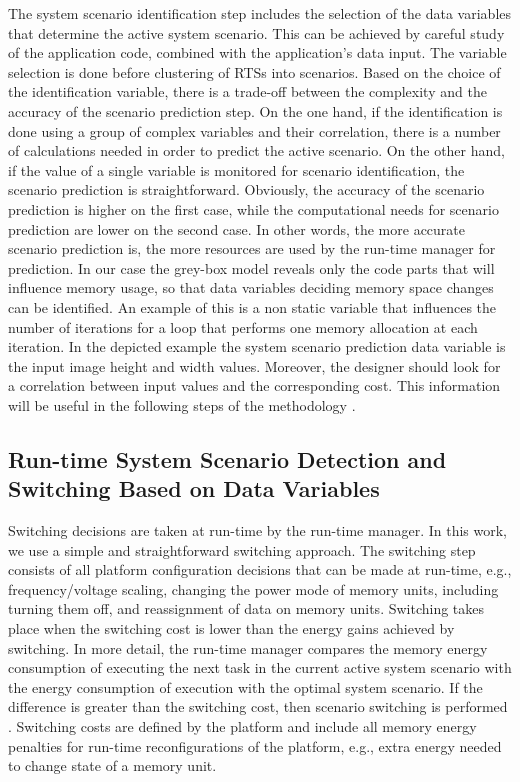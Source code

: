 \documentclass[smallcondensed]{svjour3}
\begin{document}
The system scenario identification step includes the selection of the data variables that determine the active system scenario. 
This can be achieved by careful study of the application code, combined with the application's data input.
The variable selection is done before clustering of RTSs into scenarios.
Based on the choice of the identification variable, there is a trade-off between the complexity and the accuracy of the scenario prediction step.
On the one hand, if the identification is done using a group of complex variables and their correlation, there is a number of calculations needed in order to predict the active scenario. 
On the other hand, if the value of a single variable is monitored for scenario identification, the scenario prediction is straightforward.
Obviously, the accuracy of the scenario prediction is higher on the first case, while the computational needs for scenario prediction are lower on the second case.
In other words, the more accurate scenario prediction is, the more resources are used by the run-time manager for prediction.
In our case the grey-box model reveals only the code parts that will influence memory usage, so that data variables deciding memory space changes can be identified. 
An example of this is a non static variable that influences the number of iterations for a loop that performs one memory allocation at each iteration. 
In the depicted example the system scenario prediction data variable is the input image height and width values. 
Moreover, the designer should look for a correlation between input values and the corresponding cost. 
This information will be useful in the following steps of the methodology \cite{tcm}.

\subsection{Run-time System Scenario Detection and Switching Based on Data Variables}

Switching decisions are taken at run-time by the run-time manager. 
In this work, we use a simple and straightforward switching approach.
The switching step consists of all platform configuration decisions that can be made at run-time, e.g., frequency/voltage scaling, changing the power mode of memory units, including turning them off, and reassignment of data on memory units. 
Switching takes place when the switching cost is lower than the energy gains achieved by switching. 
In more detail, the run-time manager compares the memory energy consumption of executing the next task in the current active system scenario with the energy consumption of execution with the optimal system scenario. 
If the difference is greater than the switching cost, then scenario switching is performed \cite{tcm}. 
Switching costs are defined by the platform and include all memory energy penalties for run-time reconfigurations of the platform, e.g., extra energy needed to change state of a memory unit.
\end{document}
